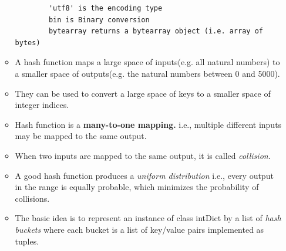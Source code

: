 \documentclass[11pt]{article}
\begin{document}
\begin{enumerate}
\begin{itemize}
\begin{verbatim}
        'utf8' is the encoding type
        bin is Binary conversion
        bytearray returns a bytearray object (i.e. array of bytes)
            \end{verbatim}
            \item A hash function maps a large space of inputs(e.g. all natural numbers) to a smaller space of outputs(e.g. the natural numbers between 0 and 5000).
            \item They can be used to convert a large space of keys to a smaller space of integer indices.
            \item Hash function is a \textbf{many-to-one mapping.} i.e., multiple different inputs may be mapped to the same output.
            \item When two inputs are mapped to the same output, it is called \textit{collision}.
            \item A good hash function produces a \textit{uniform distribution} i.e., every output in the range is equally probable, which minimizes the probability of collisions.
            \item The basic idea is to represent an instance of class intDict by a list of \textit{hash buckets} where each bucket is a list of key/value pairs implemented as tuples.
        \end{itemize}
    \end{enumerate}
\end{document}
